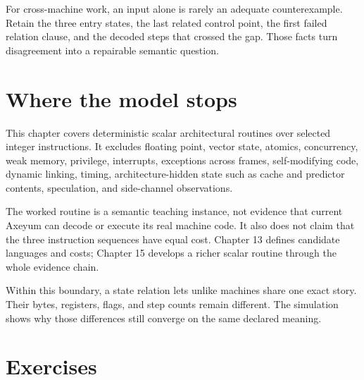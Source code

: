 \begin{sidebar}[title={A counterexample should name its control point}]
For cross-machine work, an input alone is rarely an adequate counterexample.
Retain the three entry states, the last related control point, the first
failed relation clause, and the decoded steps that crossed the gap. Those
facts turn disagreement into a repairable semantic question.
\end{sidebar}

\section{Where the model stops}

This chapter covers deterministic scalar architectural routines over selected
integer instructions. It excludes floating point, vector state, atomics,
concurrency, weak memory, privilege, interrupts, exceptions across frames,
self-modifying code, dynamic linking, timing, architecture-hidden state such
as cache and predictor contents,
speculation, and side-channel observations.

The worked routine is a semantic teaching instance, not evidence that current
Axeyum can decode or execute its real machine code. It also does not claim that
the three instruction sequences have equal cost. Chapter 13 defines candidate
languages and costs; Chapter 15 develops a richer scalar routine through the
whole evidence chain.

Within this boundary, a state relation lets unlike machines share one exact
story. Their bytes, registers, flags, and step counts remain different. The
simulation shows why those differences still converge on the same declared
meaning.

\section{Exercises}

